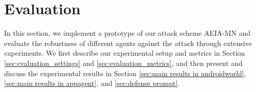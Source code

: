 \section{Evaluation}
\label{sec:evaluation}
In this section, we implement a prototype of our attack scheme AEIA-MN and evaluate the robustness of different agents against the attack through extensive experiments. We first describe our experimental setup and metrics in Section \ref{sec:evaluation_settings} and \ref{sec:evaluation_metrics}, and then present and discuss the experimental results in Section \ref{sec:main results in androidworld}, \ref{sec:main results in appagent}, and \ref{sec:defense prompt}.
























